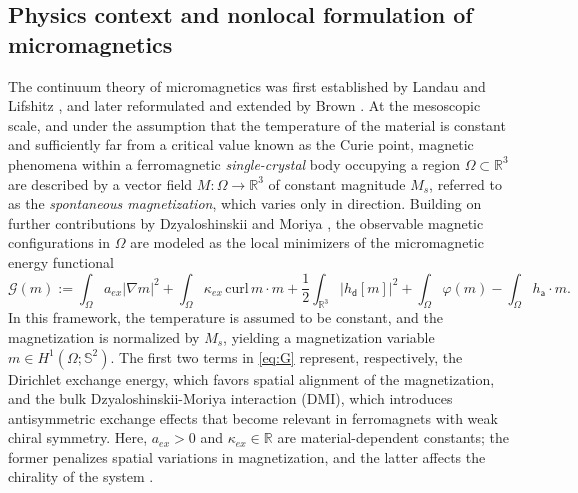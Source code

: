 \documentclass[reqno,11pt]{amsart}
\numberwithin{equation}{section}
\theoremstyle{thmlemcorr}
\numberwithin{theorem}{section}
\theoremstyle{thmlemcorr*}
\theoremstyle{defi}
\theoremstyle{remexample}
\theoremstyle{ass}
\newcommand{\R}{\mathbb{R}}
\renewcommand{\S}{\mathbb{S}}
\newcommand{\1}{\mathds{1}}
\newcommand{\Om}{\Omega}
\begin{document}
\subsection*{Physics context and nonlocal formulation of micromagnetics}

The continuum theory of micromagnetics was first established by Landau and Lifshitz \cite{LaLi35}, and later reformulated and extended by Brown \cite{Br63}. At the mesoscopic scale, and under the assumption that the temperature of the material  is constant and sufficiently far from a critical value known as the Curie point, magnetic phenomena within a ferromagnetic \textit{single-crystal} body occupying a region 
$\Om \subset \R^3$ are described by a vector field 
$M : \Om \to \R^3$ of constant magnitude $M_s$, referred to as the \textit{spontaneous magnetization}, which varies only in direction. Building on further contributions by Dzyaloshinskii \cite{Dz58} and Moriya \cite{Mo60}, the observable magnetic configurations in $\Om$ are modeled as the local minimizers of the micromagnetic energy functional
\begin{equation}
  \mathcal{G} (m) %
  := 
  \int_{\Omega} a_{ex} | \nabla m|^2 + 
  \int_{\Omega} \kappa_{ex} \, \mathrm{curl}\,m \cdot m + \frac{1}{2}  \int_{\R^3} | h_{\mathsf{d}} [m] |^2 + \int_{\Omega} \varphi(m) - \int_{\Om} h_{\mathsf{a}} \cdot m.\label{eq:G}
\end{equation}
In this framework, the temperature is assumed to be constant, and the magnetization is normalized by $M_s$, yielding a magnetization variable $m \in H^1(\Om; \S^2).$ The first two terms in \eqref{eq:G} represent, respectively, the Dirichlet exchange energy, which favors spatial alignment of the magnetization, and the bulk Dzyaloshinskii-Moriya interaction (DMI), which introduces antisymmetric exchange effects that become relevant in ferromagnets with weak chiral symmetry. Here, $a_{ex} > 0$ and $\kappa_{ex} \in \R$ are material-dependent constants; the former penalizes spatial variations in magnetization, and the latter affects the chirality of the system \cite{BoYa89}.
\end{document}
